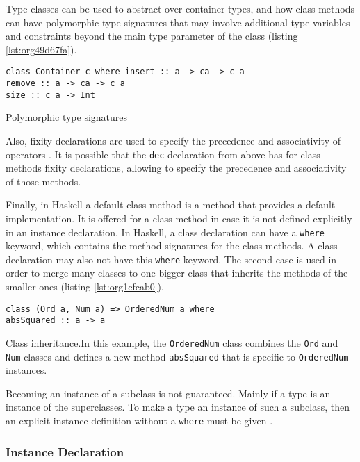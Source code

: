 \documentclass[a4paper, titlepage, twoside]{article}
\begin{document}
Type classes can be used to abstract over container types, and how class methods can have polymorphic type signatures that may involve additional type variables and constraints beyond the main type parameter of the class (listing \ref{lst:org49d67fa}).

\begin{listing}[htbp]
\begin{verbatim}
class Container c where insert :: a -> ca -> c a
remove :: a -> ca -> c a
size :: c a -> Int
\end{verbatim}
\caption{\label{lst:org49d67fa}Polymorphic type signatures}
\end{listing}

Also, fixity declarations are used to specify the precedence and associativity of operators \autocite{marlowHaskell2010Language2010}. It is possible that the \texttt{dec} declaration from above has for class methods fixity declarations, allowing to specify the precedence and associativity of those methods.

Finally, in Haskell a default class method is a method that provides a default implementation. It is offered for a class method in case it is not defined explicitly in an instance declaration. In Haskell, a class declaration can have a \texttt{where} keyword, which contains the method signatures for the class methods. A class declaration may also not have this \texttt{where} keyword. The second case is used in order to merge many classes to one bigger class that inherits the methods of the smaller ones (listing \ref{lst:org1cfcab0}).

\begin{listing}[htbp]
\begin{verbatim}
class (Ord a, Num a) => OrderedNum a where
absSquared :: a -> a
\end{verbatim}
\caption[Class inheritance]{\label{lst:org1cfcab0}Class inheritance.In this example, the \texttt{OrderedNum} class combines the \texttt{Ord} and \texttt{Num} classes and defines a new method \texttt{absSquared} that is specific to \texttt{OrderedNum} instances.}
\end{listing}

Becoming an instance of a subclass is not guaranteed. Mainly if a type is an instance of the superclasses. To make a type an instance of such a subclass, then an explicit instance definition without a \texttt{where} must be given \autocite{marlowHaskell2010Language2010}.

\subsubsection{Instance Declaration}
\label{sec:org07afaa2}
\end{document}
